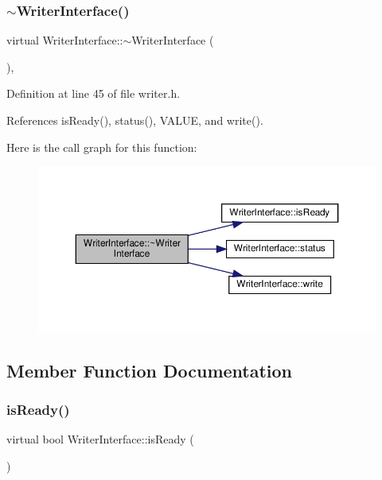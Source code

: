 \subsubsection{\texorpdfstring{$\sim$\+Writer\+Interface()}{~WriterInterface()}}
{\footnotesize\ttfamily virtual Writer\+Interface\+::$\sim$\+Writer\+Interface (\begin{DoxyParamCaption}{ }\end{DoxyParamCaption})\hspace{0.3cm}{\ttfamily [inline]}, {\ttfamily [virtual]}}



Definition at line 45 of file writer.\+h.



References is\+Ready(), status(), V\+A\+L\+UE, and write().

Here is the call graph for this function\+:\nopagebreak
\begin{figure}[H]
\begin{center}
\leavevmode
\includegraphics[width=350pt]{classWriterInterface_a4d53c1a520fca583d94ead3d656d5fc3_cgraph}
\end{center}
\end{figure}


\subsection{Member Function Documentation}
\mbox{\label{classWriterInterface_ada0c58dbea3bc216a1a687b070f2a924}} 
\subsubsection{\texorpdfstring{is\+Ready()}{isReady()}}
{\footnotesize\ttfamily virtual bool Writer\+Interface\+::is\+Ready (\begin{DoxyParamCaption}{ }\end{DoxyParamCaption})\hspace{0.3cm}{\ttfamily [pure virtual]}}


